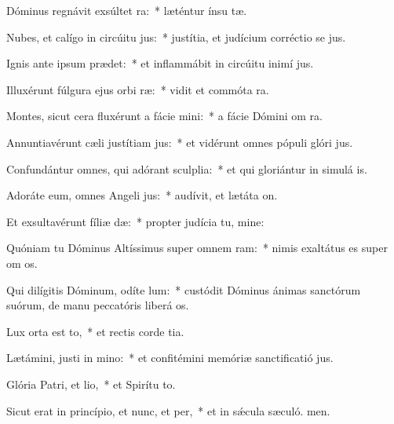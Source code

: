 \item Dóminus regnávit exsúltet ra:~* læténtur ínsu tæ.
\item Nubes, et calígo in circúitu jus:~* justítia, et judícium corréctio se jus.
\item Ignis ante ipsum prædet:~* et inflammábit in circúitu inimí jus.
\item Illuxérunt fúlgura ejus orbi ræ:~* vidit et commóta  ra.
\item Montes, sicut cera fluxérunt a fácie mini:~* a fácie Dómini om ra.
\item Annuntiavérunt cæli justítiam jus:~* et vidérunt omnes pópuli glóri jus.
\item Confundántur omnes, qui adórant sculplia:~* et qui gloriántur in simulá is.
\item Adoráte eum, omnes Angeli jus:~* audívit, et lætáta  on.
\item Et exsultavérunt fíliæ dæ:~* propter judícia tu, mine:
\item Quóniam tu Dóminus Altíssimus super omnem ram:~* nimis exaltátus es super om os.
\item Qui dilígitis Dóminum, odíte lum:~* custódit Dóminus ánimas sanctórum suórum, de manu peccatóris liberá os.
\item Lux orta est to,~* et rectis corde tia.
\item Lætámini, justi in mino:~* et confitémini memóriæ sanctificatió jus.
\item Glória Patri, et lio,~* et Spirítu to.
\item Sicut erat in princípio, et nunc, et per,~* et in sǽcula sæculó. men.
